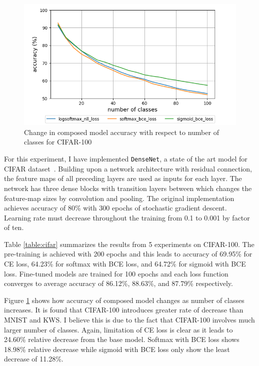 \documentclass{article}
\begin{document}
\begin{figure}[t]
    \centering
    \includegraphics[scale=0.4,trim={0mm 0mm 0mm 0mm},clip]{cifar100.png}
    \caption{Change in composed model accuracy with respect to number of classes for CIFAR-100}
    \label{figure:composed_cifar}
\end{figure}


For this experiment, I have implemented \texttt{DenseNet}, a state of the art model for CIFAR dataset~\cite{huang2017densely}. Building upon a network architecture with residual connection, the feature maps of all preceding layers are used as inputs for each layer. The network has three dense blocks with transition layers between which changes the feature-map sizes by convolution and pooling. The original implementation achieves accuracy of 80\% with 300 epochs of stochastic gradient descent. Learning rate must decrease throughout the training from 0.1 to 0.001 by factor of ten.

Table \ref{table:cifar} summarizes the results from 5 experiments on CIFAR-100. The pre-training is achieved with 200 epochs and this leads to accuracy of 69.95\% for CE loss, 64.23\% for softmax with BCE loss, and 64.72\% for sigmoid with BCE loss. Fine-tuned models are trained for 100 epochs and each loss function converges to average accuracy of 86.12\%, 88.63\%, and 87.79\% respectively.

Figure \ref{figure:composed_cifar} shows how accuracy of composed model changes as number of classes increases. It is found that CIFAR-100 introduces greater rate of decrease than MNIST and KWS. I believe this is due to the fact that CIFAR-100 involves much larger number of classes. Again, limitation of CE loss is clear as it leads to 24.60\% relative decrease from the base model. Softmax with BCE loss shows 18.98\% relative decrease while sigmoid with BCE loss only show the least decrease of 11.28\%.
\end{document}
